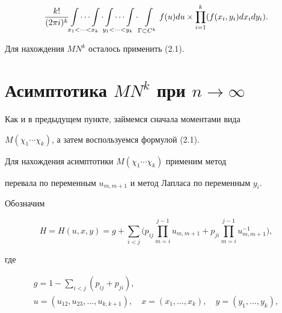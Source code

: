 \begin{equation}


\frac{k!}{(2\pi i)^k}


\idotsint\limits_{x_1<\dotsb <x_k}


\cdot


\idotsint\limits_{y_1<\dotsb <y_k}


\cdot


\int\limits_{\Gamma \subset C^k}


f(u) du \times 


\prod_{i=1}^k(f(x_i,y_i)dx_idy_i).


\end{equation}


Для нахождения $MN^k$ осталось применить (2.1).





\section{Асимптотика $MN^k$ при $n\to\infty$}





Как и в предыдущем пункте, займемся сначала моментами вида


$M(\chi_1\dotsb\chi_k)$, а затем воспользуемся формулой (2.1).





Для нахождения асимптотики $M(\chi_1\dotsb\chi_k)$ применим метод


перевала по переменным $u_{m,m+1}$ и метод Лапласа по переменным $y_i$.


Обозначим


$$


H=H(u,x,y)= g+\sum\limits_{i<j}


\bigg(p_{ij}\prod^{j-1}_{m=i} u_{m,m+1} +


p_{ji}\prod^{j-1}_{m=i} u^{-1}_{m,m+1}\bigg),


$$


где


\begin{gather*}


g=1-\sum_{i<j}(p_{ij}+p_{ji}),\\


u=(u_{12},u_{23},\dotsc,u_{k,k+1}), \quad x=(x_1,\dotsc,x_k), \quad


y=(y_1,\dotsc,y_k),


\end{gather*}


